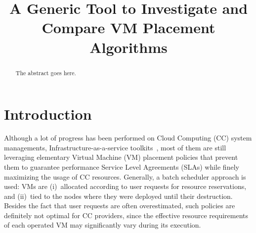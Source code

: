 \documentclass[conference]{IEEEtran}
\begin{document}
%
\title{A Generic Tool to Investigate and Compare VM Placement Algorithms}


\author{
}



\maketitle

\thispagestyle{plain}
\pagestyle{plain}


\begin{abstract}
The abstract goes here.
\end{abstract}





%
\IEEEpeerreviewmaketitle



\section{Introduction}
\label{sec:intro}

Although a lot of progress has been performed on Cloud Computing (CC)
system managements, \aka Infrastructure-as-a-service
toolkits~\cite{moreno:2012}, most of them
are still leveraging
elementary Virtual Machine (VM) placement policies that prevent them
to guarantee performance Service Level Agreements (SLAs) while
finely maximizing the usage of CC resources.
Generally, a batch scheduler
approach is used: VMs are
(i)~allocated according to user requests for resource reservations,
and (ii)~tied to the nodes where they were deployed until their
destruction. Besides the fact that user requests are often
overestimated, such policies are definitely not optimal for
CC providers, since the effective
resource requirements of each operated VM may significantly vary
during its execution.
\end{document}
